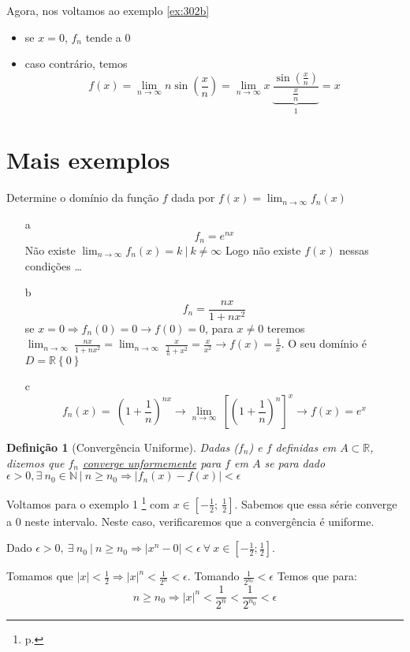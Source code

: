 \documentclass[12pt,openany]{book}
\newtheorem{definition}{Definição}[section]
\newcommand{\LI}[1][n]{\lim_{{#1} \rightarrow \infty}}
\begin{document}
Agora, nos voltamos ao exemplo \ref{ex:302b}
\begin{itemize}
\item se $x=0$, $f_n$ tende a 0
\item caso contrário, temos $$f(x) = \lim_{n \rightarrow \infty} n \sin \left(\frac{x}{n}\right) = \LI x \ \underbrace{\frac{\sin(\frac{x}{n})}{\frac{x}{n}}}_1 = x$$
\end{itemize}

\section*{Mais exemplos} Determine o domínio da função $f$ dada por $\displaystyle{f(x) = \LI f_n(x)}$

\begin{itemize}
\item [a] $$f_n= e^{nx}$$ 
 Não existe $\displaystyle{ \LI f_n(x) = k \ | \ k \neq \infty}$ Logo não existe $f(x)$ nessas condições \ldots
 \item [b] $$f_n= \frac{nx}{1+nx^2}$$
 se $x=0 \Rightarrow f_n(0) = 0 \rightarrow f(0) = 0$, para $x \neq 0$ teremos $\displaystyle{\LI \ \frac{nx}{1+nx^2} = \LI \ \frac{x}{\frac{1}{n}+x^2} = \frac{x}{x^2} \rightarrow f(x) = \frac{1}{x}}$. O seu domínio é $D = \mathds{R} \left\{0\right\}$
 \item [c] $$f_n(x) = \ \left( 1 + \frac{1}{n} \right)^{nx} \rightarrow \LI \ \left[ \left( 1 + \frac{1}{n} \right)^n \right]^x \rightarrow f(x) = e^x$$
\end{itemize}

\begin{definition}[Convergência Uniforme]
Dadas ($f_n$) e $f$ definidas em $A \subset \mathds{R}$, dizemos que $f_n$ \underline{converge unformemente} para $f$ em $A$ se para dado $\epsilon > 0, \exists \ n_0 \in \mathds{N} \ | \ n \geq n_0 \Rightarrow |f_n(x) - f(x)| < \epsilon$
\end{definition}

Voltamos para o exemplo 1 \footnote{p. \pageref{ex:302a}} com $x \in [-\frac{1}{2}; \ \frac{1}{2}]$. Sabemos que essa série converge a 0 neste intervalo. Neste caso, verificaremos que a convergência é uniforme.

Dado $\epsilon > 0, \ \exists \ n_0 \ | \ n \geq n_0 \Rightarrow |x^n-0| < \epsilon \ \forall \ x \in [-\frac{1}{2};\frac{1}{2}]$.

Tomamos que $\displaystyle{|x| < \frac{1}{2} \Rightarrow |x|^n < \frac{1}{2^n} <\epsilon}$. Tomando $\displaystyle{\frac{1}{2^{n_0}} < \epsilon}$ Temos  que para: $$n \geq n_0 \Rightarrow |x|^n < \frac{1}{2^n} < \frac{1}{2^{n_0}} < \epsilon$$
\end{document}
